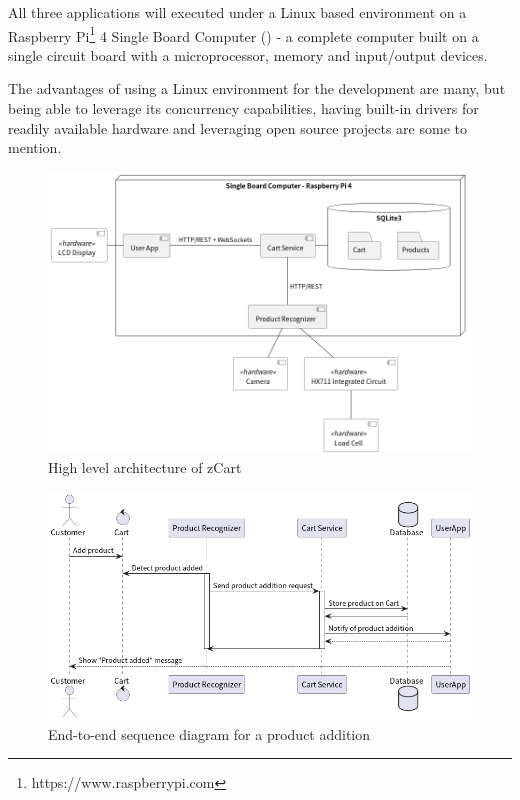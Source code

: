 \documentclass[openright]{normas-utf-tex} %
\begin{document}
All three applications will executed under a Linux \cite{Tanenbaum2015} 
based environment on a Raspberry Pi\footnote{https://www.raspberrypi.com} 4 Single Board
Computer () - a complete computer built on a single 
circuit board with a microprocessor, memory and input/output devices.

The advantages of using a Linux environment for the development are many, but
being able to leverage its concurrency capabilities, having built-in drivers
for readily available hardware and leveraging open source projects are some to
mention.

\begin{figure}[H]
	\centering
	\includegraphics[width=1\textwidth]{./images/zCart.png}
	\caption[High level architecture of zCart]{High level architecture of zCart}
	\label{fig:architecture}
\end{figure}


\begin{figure}[H]
	\centering
	\includegraphics[width=1\textwidth]{./images/E2E.png}
	\caption[End-to-end sequence diagram for a product addition]{End-to-end sequence diagram for a product addition}
	\label{fig:e2eseq}
\end{figure}
\end{document}
